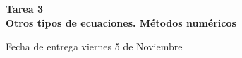 \documentclass[12pt]{exam}
\begin{document}
\centering


\Large 
\textbf{\huge Tarea 3\\ \large Otros tipos de ecuaciones. Métodos numéricos}

\small
Fecha de entrega viernes 5 de Noviembre
\vskip10pt

\normalsize

\pointformat{\bfseries\boldmath(\thepoints)}
\vskip10pt
\end{document}
